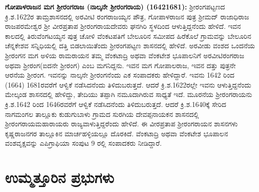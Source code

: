 \textbf{ಗೋಪಾಳರಾಜನ ಮಗ ಶ‍್ರೀರಂಗರಾಜ (ನಾಲ್ಕನೇ ಶ‍್ರೀರಂಗರಾಯ) (1642\general{\enginline{-}}1681): } ಶ‍್ರೀರಂಗಪಟ್ಟಣದ ಕ್ರಿ.ಶ.1622ರ ತಾಮ್ರಶಾಸನದಲ್ಲಿ ಅರವೀಟಿ ರಂಗರಾಜಯ್ಯನ ಪೌತ್ರ, ಗೋಪಾಳರಾಜನ ಪುತ್ರ ಶ‍್ರೀಮದ್​ ರಾಜಾಧಿರಾಜ ರಾಜಪರಮೇಶ್ವರ ಶ‍್ರೀ ವೀರಪ್ರತಾಪ ಶ‍್ರೀರಂಗರಾಯದೇವರು ಘನಗಿರಿ ಸ್ಥಳದಿಂದ ಆಳುತ್ತಿದ್ದನೆಂದು ಹೇಳಿದೆ. ಇವನ ಕಾಲದಲ್ಲಿ ತಿರುವೆಂಗಟಯ್ಯನ ಪುತ್ರ ಚೋಳಿ ವೆಂಕಟಪತಿಗೆ ಬೇಲೂರಿನ ಸಮೀಪದ ಹಿರೆಕೊಲೆ ಗ್ರಾಮವನ್ನು ಬೇಲೂರಿನ ಚೆನ್ನಕೇಶವ ಸನ್ನಿಧಿಯಲ್ಲಿ ದತ್ತಿ ಬಿಡಲಾಯಿತೆಂದು ಶ‍್ರೀರಂಗಪಟ್ಟಣ ಶಾಸನದಲ್ಲಿ ಹೇಳಿದೆ. ಅರವೀಡು ವಂಶದ ಒಂದನೆಯ ಶ‍್ರೀರಂಗನ ಮಗ ಅಳಿಯ ರಾಮರಾಯನ ತಮ್ಮ ವೆಂಕಟಾದ್ರಿ ಅಥವಾ ವೆಂಕಟೇಶ ಭೂಪಾಲನಿಗೆ ಅರವೀಟಿರಂಗರಾಜ ಅಥವಾ ಶ‍್ರೀರಂಗ(ಐದನೇ ಶ‍್ರೀರಂಗ) ಎಂಬ ಮಗನಿದ್ದನು. ಇವನ ಮಗ ಗೋಪಾಲರಾಜ, ಇವನ ದತ್ತು ಪುತ್ರನೇ ಆರನೆಯ ಶ‍್ರೀರಂಗ. ಇವನನ್ನು ನಾಲ್ಕನೇ ಶ‍್ರೀರಂಗನೆಂದು ಎಕ ಸಂಪಾದಕರು ಹೇಳಿದ್ದಾರೆ. ಇವನು 1642 ರಿಂದ (1664) 1681ರವರೆಗೆ ಆಳ್ವಿಕೆ ನಡೆಸಿದನೆಂದು ತಿಳಿದುಬರುತ್ತದೆ. ಆದರೆ ಕ್ರಿ.ಶ.1622ರಲ್ಲೇ ಇವನು ಆಳುತ್ತಿದ್ದನೆಂದು ಮೇಲ್ಕಂಡ ಶಾಸನದಲ್ಲಿ ಹೇಳಿದ್ದು, ತೇದಿಯು ತಪ್ಪಾಗಿ ನಮೂದಾಗಿರುವ ಸಾಧ್ಯತೆ ಇದೆ. ಮೂರನೆಯ ಶ‍್ರೀರಂಗರಾಯನು ಕ್ರಿ.ಶ.1642 ರಿಂದ 1646ರವರೆಗೆ ಆಳ್ವಿಕೆ ನಡೆಸಿದನೆಂದು ತಿಳಿದುಬರುತ್ತದೆ. ಆದರೆ ಕ್ರಿ.ಶ.1640ಕ್ಕೆ ಸೇರಿದ ನಾಗಮಂಗಲ ತಾಲ್ಲೂಕು ಕುಡುಗುಬಾಳು ಗ್ರಾಮದ ಸುರಗಿಯ ದೇವಪ್ಪನಾಯಕನ ಶಾಸನದಲ್ಲಿ ಶ‍್ರೀರಂಗರಾಯಮಹಾರಾಯರು ರಾಜ್ಯವಾಳುತ್ತಿದ್ದರೆಂದು ಹೇಳಿದೆ. ಈ ವೀರಪ್ರತಾಪ ಶ‍್ರೀರಂಗರಾಯನ ಶಾಸನಗಳು ಕೃಷ್ಣರಾಜನಗರ ತಾಲ್ಲೂಕಿನ ಮಾರ್ಚಹಳ್ಳಿಯಲ್ಲೂ ದೊರಕಿದೆ. ವೆಂಕಟಾದ್ರಿ ಅಥವಾ ವೆಂಕಟೇಶ ಭೂಪಾಲನ ವಂಶವೃಕ್ಷವನ್ನು ಎಪಿಗ್ರಾಫಿಯಾ ಸಂಪುಟ 9 ರಲ್ಲಿ ಸಂಪಾದಕರು ನೀಡಿದ್ದಾರೆ.


\section{ಉಮ್ಮತ್ತೂರಿನ ಪ್ರಭುಗಳು}

